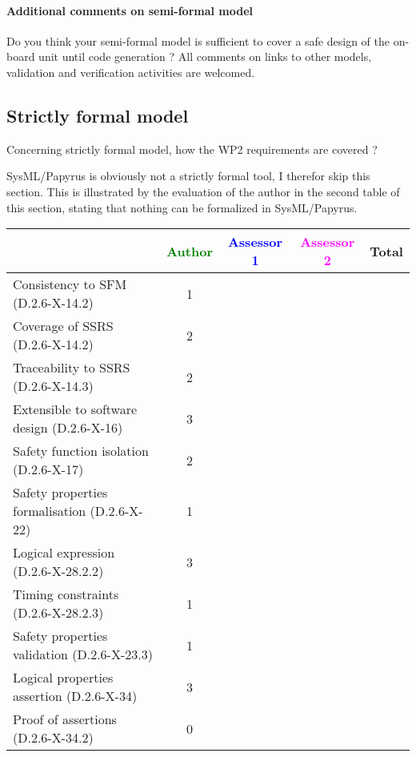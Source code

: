 \paragraph{Additional comments on semi-formal model} Do you think your semi-formal model is sufficient to cover a safe design of the on-board unit until code generation ?
All comments on links to other models, validation and verification activities are welcomed.

\subsection{Strictly formal model}

Concerning strictly formal model, how the WP2 requirements are covered ?

\begin{assessor1}
SysML/Papyrus is obviously not a strictly formal tool, I therefor skip this section. 
This is illustrated by the evaluation of the author in the second table of this section, stating that nothing can be formalized in SysML/Papyrus. 
\end{assessor1}

\begin{tabular}{|l | c | c | c | c|}
\hline
& \textcolor{green}{Author} & \textcolor{blue}{Assessor 1} & \textcolor{magenta}{Assessor 2} & Total \\
\hline
Consistency to SFM (D.2.6-X-14.2) & 1 & & & \\
\hline
Coverage of SSRS (D.2.6-X-14.2) & 2 & & & \\
\hline
Traceability to SSRS (D.2.6-X-14.3) & 2 && & \\
\hline
Extensible to software design (D.2.6-X-16) & 3 & & & \\
\hline
Safety function isolation (D.2.6-X-17) & 2 & & & \\
\hline
Safety properties formalisation (D.2.6-X-22) & 1 & & & \\
\hline
Logical expression (D.2.6-X-28.2.2) & 3 & & & \\
\hline
Timing constraints (D.2.6-X-28.2.3) & 1 & & & \\
\hline
Safety properties validation (D.2.6-X-23.3) & 1 & & & \\
\hline
Logical properties assertion (D.2.6-X-34) & 3 & & & \\
\hline
Proof of assertions (D.2.6-X-34.2) & 0 & & & \\
\hline
\end{tabular}

